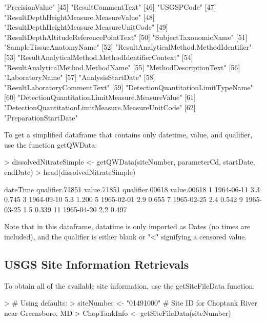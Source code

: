 \documentclass[a4paper,11pt]{article}
\begin{document}
\begin{Schunk}
\begin{Soutput}
[44] "PrecisionValue"                                   
[45] "ResultCommentText"                                
[46] "USGSPCode"                                        
[47] "ResultDepthHeightMeasure.MeasureValue"            
[48] "ResultDepthHeightMeasure.MeasureUnitCode"         
[49] "ResultDepthAltitudeReferencePointText"            
[50] "SubjectTaxonomicName"                             
[51] "SampleTissueAnatomyName"                          
[52] "ResultAnalyticalMethod.MethodIdentifier"          
[53] "ResultAnalyticalMethod.MethodIdentifierContext"   
[54] "ResultAnalyticalMethod.MethodName"                
[55] "MethodDescriptionText"                            
[56] "LaboratoryName"                                   
[57] "AnalysisStartDate"                                
[58] "ResultLaboratoryCommentText"                      
[59] "DetectionQuantitationLimitTypeName"               
[60] "DetectionQuantitationLimitMeasure.MeasureValue"   
[61] "DetectionQuantitationLimitMeasure.MeasureUnitCode"
[62] "PreparationStartDate"                             
\end{Soutput}
\end{Schunk}

To get a simplified dataframe that contains only datetime, value, and qualifier, use the function getQWData:

\begin{Schunk}
\begin{Sinput}
> dissolvedNitrateSimple <- getQWData(siteNumber, parameterCd, startDate, endDate)
> head(dissolvedNitrateSimple)
\end{Sinput}
\begin{Soutput}
     dateTime qualifier.71851 value.71851 qualifier.00618 value.00618
1  1964-06-11                         3.3                       0.745
3  1964-09-10                         5.3                       1.200
5  1965-02-01                         2.9                       0.655
7  1965-02-25                         2.4                       0.542
9  1965-03-25                         1.5                       0.339
11 1965-04-20                         2.2                       0.497
\end{Soutput}
\end{Schunk}
Note that in this dataframe, datatime is only imported as Dates (no times are included), and the qualifier is either blank or "<" signifying a censored value.


\subsection{USGS Site Information Retrievals}
To obtain all of the available site information, use the getSiteFileData function:
\begin{Schunk}
\begin{Sinput}
> # Using defaults:
> siteNumber <- "01491000" # Site ID for Choptank River near Greensboro, MD
> ChopTankInfo <- getSiteFileData(siteNumber)
\end{Sinput}
\end{Schunk}
\end{document}
